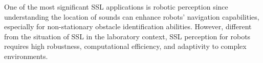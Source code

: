  One of the most significant SSL applications is robotic perception since understanding the location of sounds can enhance robots' navigation capabilities, especially for non-stationary obstacle identification abilities. However, different from the situation of SSL in the laboratory context, SSL perception for robots requires high robustness, computational efficiency, and adaptivity to complex environments.
























